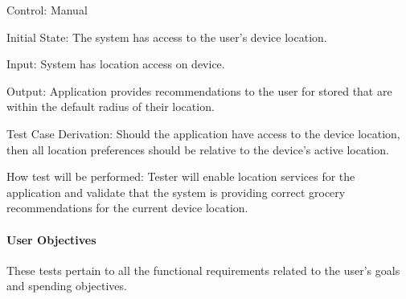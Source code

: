 \documentclass[12pt, titlepage]{article}
\begin{document}
\begin{enumerate}
Control: Manual
          
Initial State: The system has access to the user's device location.

Input: System has location access on device.
          
Output: Application provides recommendations to the user for stored that are within the default radius of their location.

Test Case Derivation: Should the application have access to the device location, then all location preferences should be
relative to the device's active location.
          
How test will be performed: Tester will enable location services for the application and validate that the system is providing correct grocery recommendations for the current device location.

\end{enumerate}

\paragraph{User Objectives}

These tests pertain to all the functional requirements related to the user's goals and spending objectives.
\end{document}
